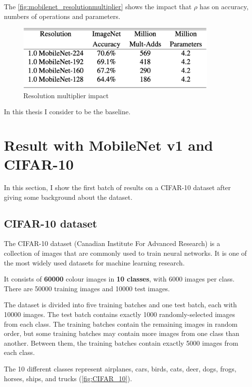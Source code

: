 The \autoref{fig:mobilenet_resolutionmultiplier} shows the impact that $\rho$
has on accuracy, numbers of operations and parameters.

\begin{figure}[ht]
    \includegraphics[width=10cm]{images/results/mobilenet_resolutionmultiplier.png}
    \centering
    \caption{Resolution multiplier impact}\label{fig:mobilenet_resolutionmultiplier}
\end{figure}

In this thesis I consider  to be the baseline.

\section{Result with MobileNet v1 and CIFAR-10}
In this section, I show the first batch of results on a CIFAR-10 dataset after
giving some background about the dataset.

\subsection{CIFAR-10 dataset}
The CIFAR-10 dataset (Canadian Institute For Advanced Research) is a collection
of images that are commonly used to train neural networks. It is one of the
most widely used datasets for machine learning research.

It consists of \textbf{60000}  colour images in
\textbf{10 classes}, with 6000 images per class. There are 50000 training
images and 10000 test images.

The dataset is divided into five training batches and one test batch, each with
10000 images. The test batch contains exactly 1000 randomly-selected images
from each class. The training batches contain the remaining images in random
order, but some training batches may contain more images from one class than
another. Between them, the training batches contain exactly 5000 images from
each class.

The 10 different classes represent airplanes, cars, birds, cats, deer, dogs,
frogs, horses, ships, and trucks (\autoref{fig:CIFAR_10}).

